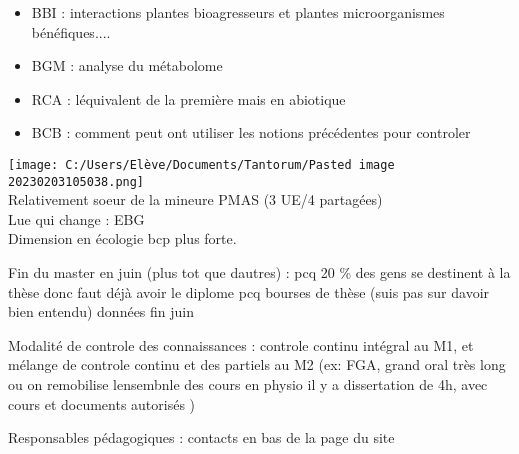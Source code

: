 \documentclass[
]{article}
\providecommand{\tightlist}{%
  \setlength{\itemsep}{0pt}\setlength{\parskip}{0pt}}
\begin{document}
\begin{itemize}
\tightlist
\item
  BBI : interactions plantes bioagresseurs et plantes microorganismes
  bénéfiques....
\item
  BGM : analyse du métabolome
\item
  RCA : l\textquotesingle équivalent de la première mais en abiotique
\item
  BCB : comment peut ont utiliser les notions précédentes pour controler
\end{itemize}

\texttt{[image: C:/Users/Elève/Documents/Tantorum/Pasted image 20230203105038.png]}\\
Relativement soeur de la mineure PMAS (3 UE/4 partagées)\\
L\textquotesingle ue qui change : EBG\\
Dimension en écologie bcp plus forte.

Fin du master en juin (plus tot que d\textquotesingle autres) : pcq 20
\% des gens se destinent à la thèse donc faut déjà avoir le diplome pcq
bourses de thèse (suis pas sur d\textquotesingle avoir bien entendu)
données fin juin

Modalité de controle des connaissances : controle continu intégral au
M1, et mélange de controle continu et des partiels au M2 (ex: FGA, grand
oral très long ou on remobilise l\textquotesingle ensembnle des cours
\textbar{} en physio il y a dissertation de 4h, avec cours et documents
autorisés )

Responsables pédagogiques : contacts en bas de la page du site
\end{document}

